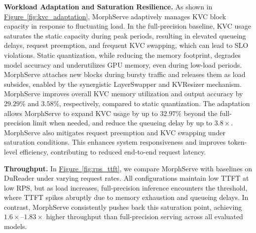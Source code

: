 \documentclass{article}
\newcommand{\system}{{MorphServe}\xspace}
\newcommand{\quant}{\small\textsf{LayerSwapper}\xspace}
\newcommand{\kvc}{\small\textsf{KVResizer}\xspace}
\begin{document}
{\textbf{Workload Adaptation and Saturation Resilience.}
As shown in \hyperref[fig:kvc_adaptation]{Figure~\ref{fig:kvc_adaptation}}, {\system} adaptively manages KVC block capacity in response to fluctuating load. In the full-precision baseline, KVC usage saturates the static capacity during peak periods, resulting in elevated queueing delays, request preemption, and frequent KVC swapping, which can lead to SLO violations. Static quantization, while reducing the memory footprint, 
degrades model accuracy and underutilizes GPU memory, even during low-load periods. 
{\system} attaches new blocks during bursty traffic and releases them as load subsides, enabled by the synergistic {\quant} and {\kvc} mechanism. 
{\system} improves overall KVC memory utilization and output accuracy by $29.29\%$ and $3.58\%$, respectively, compared to static quantization. The adaptation allows {\system} to expand KVC usage by up to $32.97\%$ beyond the full-precision limit when needed, and reduce the queueing delay by up to $3.8\times$. 
{\system} also mitigates request preemption and KVC swapping under saturation conditions. 
This enhances system responsiveness and improves token-level efficiency, contributing to reduced end-to-end request latency.  






\textbf{Throughput.} 
In \hyperref[fig:rps_ttft]{Figure~\ref{fig:rps_ttft}}, we compare {\system} with baselines on DuReader under varying request rates. All configurations maintain low TTFT at low RPS, but as load increases, full-precision inference encounters the threshold, where TTFT spikes abruptly due to memory exhaustion and queueing delays. In contrast, {\system} consistently pushes back this saturation point, achieving $1.6\times$–$1.83\times$ higher throughput than full-precision serving across all evaluated models.



}
\end{document}

